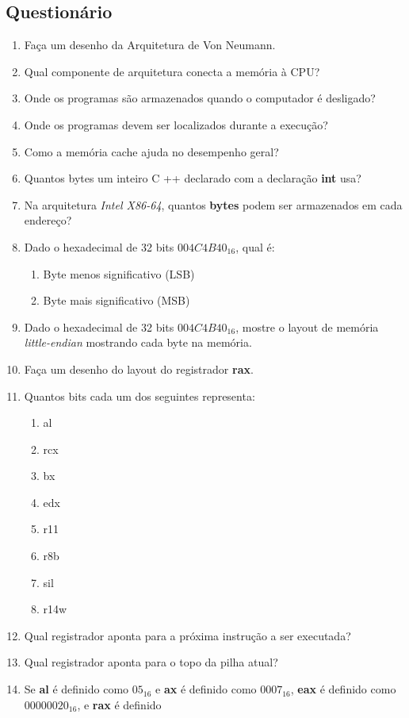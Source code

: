 \subsection{Questionário}
\begin{enumerate}
	\item Faça um desenho da Arquitetura de Von Neumann.
	\item  Qual componente de arquitetura conecta a memória à CPU?
	\item  Onde os programas são armazenados quando o computador é desligado?
	\item  Onde os programas devem ser localizados durante a execução?
	\item  Como a memória cache ajuda no desempenho geral?
	\item  Quantos bytes um inteiro C ++ declarado com a declaração \textbf{int} usa?
	\item  Na arquitetura \textit{Intel X86-64}, quantos \textbf{bytes} podem ser armazenados em cada endereço?
	\item Dado o hexadecimal de 32 bits $ 004C4B40_{16} $, qual é:
	\begin{enumerate}
		\item Byte menos significativo (LSB)
		\item Byte mais significativo (MSB)
	\end{enumerate}
    \item Dado o hexadecimal de 32 bits $ 004C4B40_{16} $, mostre o layout de memória \textit{little-endian} mostrando cada byte na memória.
	\item  Faça um desenho do layout do registrador \textbf{rax}.
	\item  Quantos bits cada um dos seguintes representa:
	\begin{enumerate}
		\item al
		\item rcx
		\item bx
		\item edx
		\item r11
		\item r8b
		\item sil
		\item r14w
	\end{enumerate}
    \item Qual registrador aponta para a próxima instrução a ser executada?
    \item Qual registrador aponta para o topo da pilha atual?
    \item Se \textbf{al} é definido como $ 05_{16} $ e \textbf{ax} é definido como $ 0007_{16} $, \textbf{eax} é definido como $ 00000020_{16} $, e \textbf{rax} é definido

\end{enumerate}
